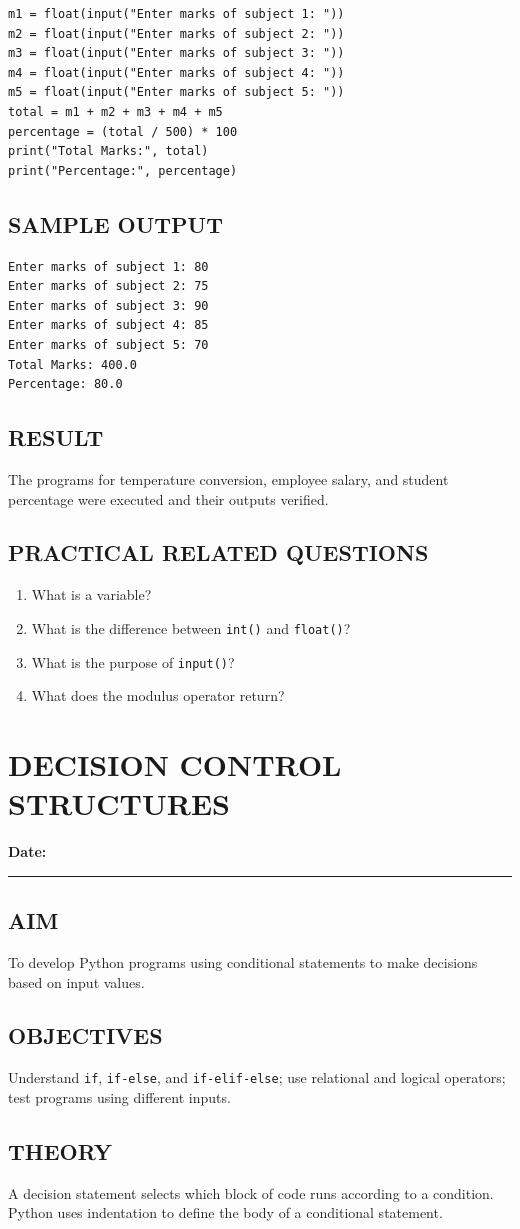 \documentclass[12pt,a4paper]{report}
\newcommand{\experimentdate}{\hfill\textbf{Date:} \rule{3cm}{0.4pt}}
\newcommand{\aim}[1]{\section*{AIM}#1}
\newcommand{\result}[1]{\section*{RESULT}#1}
\newcommand{\questions}[1]{\section*{PRACTICAL RELATED QUESTIONS}#1}
\newcommand{\sampleoutput}{\section*{SAMPLE OUTPUT}}
\begin{document}
\begin{lstlisting}
m1 = float(input("Enter marks of subject 1: "))
m2 = float(input("Enter marks of subject 2: "))
m3 = float(input("Enter marks of subject 3: "))
m4 = float(input("Enter marks of subject 4: "))
m5 = float(input("Enter marks of subject 5: "))
total = m1 + m2 + m3 + m4 + m5
percentage = (total / 500) * 100
print("Total Marks:", total)
print("Percentage:", percentage)
\end{lstlisting}
\sampleoutput
\begin{verbatim}
Enter marks of subject 1: 80
Enter marks of subject 2: 75
Enter marks of subject 3: 90
Enter marks of subject 4: 85
Enter marks of subject 5: 70
Total Marks: 400.0
Percentage: 80.0
\end{verbatim}

\result{The programs for temperature conversion, employee salary, and student percentage were executed and their outputs verified.}

\questions{
\begin{enumerate}
\item What is a variable?
\item What is the difference between \texttt{int()} and \texttt{float()}?
\item What is the purpose of \texttt{input()}?
\item What does the modulus operator return?
\end{enumerate}}

\chapter{DECISION CONTROL STRUCTURES}
\experimentdate

\aim{To develop Python programs using conditional statements to make decisions based on input values.}

\section*{OBJECTIVES}
Understand \texttt{if}, \texttt{if-else}, and \texttt{if-elif-else}; use relational and logical operators; test programs using different inputs.

\section*{THEORY}
A decision statement selects which block of code runs according to a condition.
Python uses indentation to define the body of a conditional statement.
\end{document}
